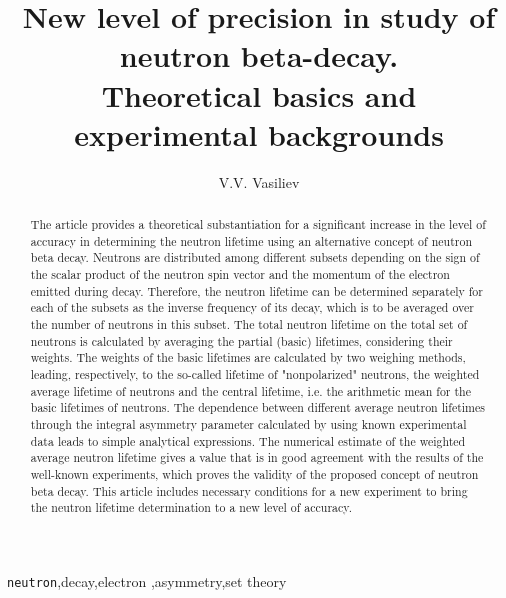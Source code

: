 \documentclass[article]{elsarticle}
\begin{document}
\begin{frontmatter}

\title{New level of precision in study of neutron beta-decay. \\
Theoretical basics and experimental backgrounds
}

\author{V.V. Vasiliev }
\address{NRC "Kurchatov Institute" - ITEP\\
25, B. Cheremushkinskaya, Moscow, Russian Federation}


\begin{abstract}
The article provides a theoretical substantiation for a significant increase in the level of accuracy in determining the neutron lifetime using an alternative concept of neutron beta decay. Neutrons are distributed among different subsets depending on the sign of the scalar product of the neutron spin vector and the momentum of the electron emitted during decay. Therefore, the neutron lifetime can be  determined separately for each of the subsets as the inverse frequency of its decay, which is to be averaged over the number of neutrons in this subset. The total neutron lifetime on the total set of neutrons is calculated by averaging the partial (basic) lifetimes, considering their weights. The weights of the basic lifetimes are calculated by two weighing methods, leading, respectively, to the so-called lifetime of "nonpolarized" neutrons, the weighted average lifetime of neutrons and the central lifetime, i.e. the arithmetic mean for the basic lifetimes of neutrons. The dependence between different average neutron lifetimes through the integral asymmetry parameter calculated by using known experimental data leads to simple analytical expressions. The numerical estimate of the weighted average neutron lifetime gives a value that is in good agreement with the results of the well-known experiments, which proves the validity of the proposed concept of neutron beta decay. This article includes necessary conditions for a new experiment to bring the neutron lifetime determination to a new level of accuracy.

\end{abstract}

\begin{keyword}
\texttt{neutron}\sep decay\sep electron \sep asymmetry\sep  set theory
\end{keyword}

\end{frontmatter}
\end{document}
